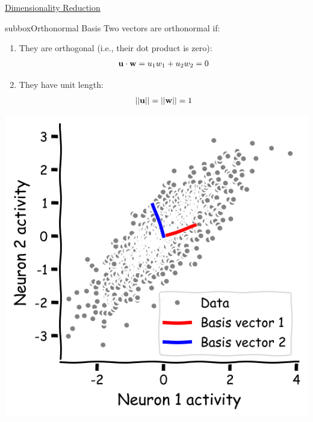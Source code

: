 \begin{textbox}{\href{https://compneuro.neuromatch.io/tutorials/W1D4_DimensionalityReduction/student/W1D4_Tutorial1.html}{Dimensionality Reduction } }
\begin{subbox}{subbox}{Orthonormal Basis
}
\scriptsize
Two vectors are orthonormal if: 
\begin{enumerate}
    \item 
   They are orthogonal (i.e., their dot product is zero):
\begin{align}
{\bf u\cdot w} = u_1 w_1 + u_2 w_2 = 0
\end{align}
\item   They have unit length:
\begin{align}
||{\bf u} || = ||{\bf w} || = 1
\end{align}
\end{enumerate}
\centering
\includegraphics[scale=0.18]{Figures/DM/DMFigure2.png}

\end{subbox}
\end{textbox}
